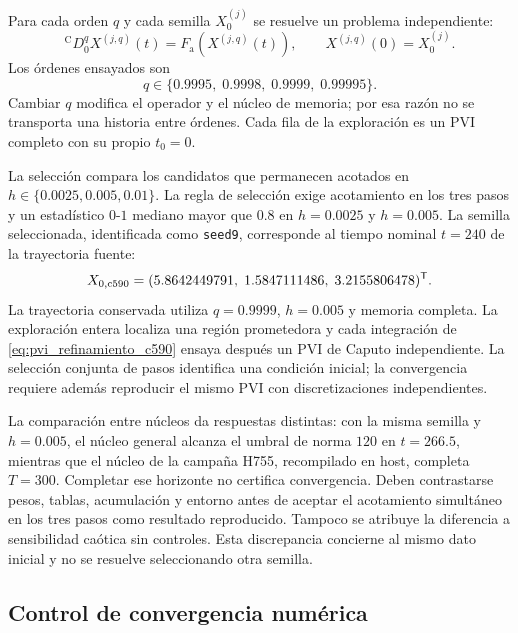 Para cada orden \(q\) y cada semilla \(X_0^{(j)}\) se resuelve un problema
independiente:
\begin{equation}
{}^{\mathrm C}D_{0}^{q}X^{(j,q)}(t)
=F_{\mathrm a}\!\left(X^{(j,q)}(t)\right),
\qquad X^{(j,q)}(0)=X_0^{(j)}.
\label{eq:pvi_refinamiento_c590}
\end{equation}
Los órdenes ensayados son
\begin{equation}
q\in\{0.9995,\;0.9998,\;0.9999,\;0.99995\}.
\label{eq:ordenes_refinamiento}
\end{equation}
Cambiar \(q\) modifica el operador y el núcleo de memoria; por esa razón no se
transporta una historia entre órdenes. Cada fila de la exploración es un PVI
completo con su propio \(t_0=0\).

La selección compara los candidatos que permanecen acotados en
\(h\in\{0.0025,0.005,0.01\}\). La regla de selección exige acotamiento en los
tres pasos y un estadístico \(0\)-\(1\) mediano mayor que \(0.8\) en
\(h=0.0025\) y \(h=0.005\). La semilla seleccionada, identificada como
\texttt{seed9}, corresponde al tiempo nominal \(t=240\) de la trayectoria
fuente:
\begin{equation}
X_{0,\mathrm{c590}}=
(5.8642449791,\;1.5847111486,\;3.2155806478)^{\mathsf T}.
\label{eq:semilla_c590}
\end{equation}
La trayectoria conservada utiliza \(q=0.9999\), \(h=0.005\) y memoria
completa. La exploración entera localiza una región prometedora y cada
integración de \cref{eq:pvi_refinamiento_c590} ensaya después un PVI de Caputo
independiente. La selección conjunta de pasos identifica una condición inicial; la convergencia
requiere además reproducir el mismo PVI con discretizaciones independientes.

La comparación entre núcleos da respuestas distintas: con la misma semilla y \(h=0.005\), el núcleo general alcanza el
umbral de norma \(120\) en \(t=266.5\), mientras que el núcleo de la campaña
H755, recompilado en host, completa \(T=300\). Completar ese horizonte no
certifica convergencia. Deben contrastarse pesos, tablas, acumulación y entorno
antes de aceptar el acotamiento simultáneo en los tres pasos como resultado
reproducido. Tampoco se atribuye la diferencia a sensibilidad caótica sin
controles. Esta discrepancia concierne al mismo dato inicial y no se resuelve
seleccionando otra semilla.

\subsection{Control de convergencia numérica}
\label{sec:control_numerico}

